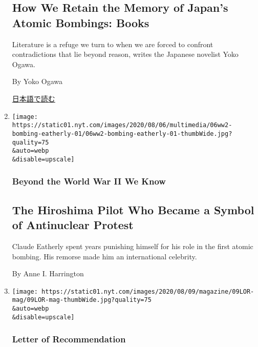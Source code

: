 \begin{enumerate}
  \hypertarget{how-we-retain-the-memory-of-japans-atomic-bombings-books}{%
  \subsection{How We Retain the Memory of Japan's Atomic Bombings:
  Books}\label{how-we-retain-the-memory-of-japans-atomic-bombings-books}}

  Literature is a refuge we turn to when we are forced to confront
  contradictions that lie beyond reason, writes the Japanese novelist
  Yoko Ogawa.

  By Yoko Ogawa

  \href{https://www.nytimes.com/ja/2020/08/06/magazine/atomic-bombings-japan-books-hiroshima-nagasaki.html}{日本語で読む}
\item
  \href{/2020/08/06/magazine/hiroshima-claude-eatherly-antinuclear.html}{}

  \texttt{[image: https://static01.nyt.com/images/2020/08/06/multimedia/06ww2-bombing-eatherly-01/06ww2-bombing-eatherly-01-thumbWide.jpg?quality=75\\\&auto=webp\\\&disable=upscale]}

  \hypertarget{beyond-the-world-war-ii-we-know-1}{%
  \subsubsection{Beyond the World War II We
  Know}\label{beyond-the-world-war-ii-we-know-1}}

  \hypertarget{the-hiroshima-pilot-who-became-a-symbol-of-antinuclear-protest}{%
  \subsection{The Hiroshima Pilot Who Became a Symbol of Antinuclear
  Protest}\label{the-hiroshima-pilot-who-became-a-symbol-of-antinuclear-protest}}

  Claude Eatherly spent years punishing himself for his role in the
  first atomic bombing. His remorse made him an international celebrity.

  By Anne I. Harrington
\item
  \href{/2020/08/05/magazine/fly-casting-on-city-streets-is-weird-thats-why-i-love-it.html}{}

  \texttt{[image: https://static01.nyt.com/images/2020/08/09/magazine/09LOR-mag/09LOR-mag-thumbWide.jpg?quality=75\\\&auto=webp\\\&disable=upscale]}

  \hypertarget{letter-of-recommendation}{%
  \subsubsection{Letter of
  Recommendation}\label{letter-of-recommendation}}


\end{enumerate}

